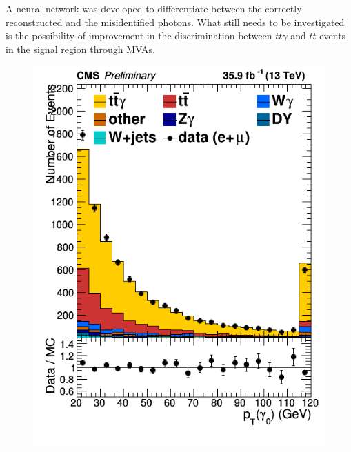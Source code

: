 \documentclass[11pt]{scrartcl}
\begin{document}
A neural network was developed to differentiate between the correctly reconstructed and the misidentified photons. What still needs to be investigated is the possibility of improvement in the discrimination between $t\overline{t}\gamma$ and $t\overline{t}$ events in the signal region through MVAs.

\begin{figure}[H]
\centering
\begin{minipage}{.5\textwidth}
  \centering
  \includegraphics[width=0.95\linewidth]{figures/PhotonGood0_pt_lin.png}
  \label{fig:PhotonPT}
\end{minipage}%
\begin{minipage}{.5\textwidth}
  \centering

\end{minipage}
\end{figure}
\end{document}
